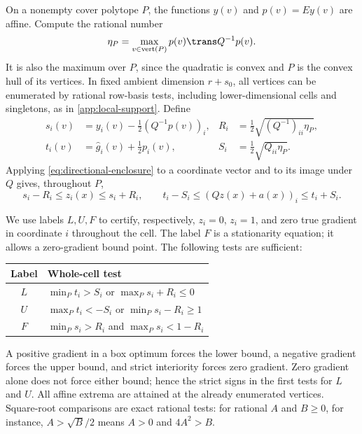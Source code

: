 On a nonempty cover polytope $P$, the functions $y(v)$ and $p(v)=Ey(v)$
are affine. Compute the rational number
\begin{equation}\label{eq:screening-eta}
       \eta_P=\max_{v\in\operatorname{vert}(P)}p(v)\trans Q^{-1}p(v).
\end{equation}
It is also the maximum over $P$, since the quadratic is convex and
$P$ is the convex hull of its vertices. In fixed ambient dimension
$r+s_0$, all vertices can be enumerated by rational row-basis tests,
including lower-dimensional cells and singletons, as in
\cref{app:local-support}. Define
\begin{align}
 s_i(v)&=y_i(v)-\tfrac12(Q^{-1}p(v))_i,&
 R_i&=\tfrac12\sqrt{(Q^{-1})_{ii}\eta_P},
 \label{eq:screening-centers}\\
 t_i(v)&=\widehat g_i(v)+\tfrac12p_i(v),&
 S_i&=\tfrac12\sqrt{Q_{ii}\eta_P}.
 \nonumber
\end{align}
Applying \eqref{eq:directional-enclosure} to a coordinate vector
and to its image under $Q$ gives, throughout $P$,
\begin{equation}\label{eq:screening-coordinate-gradient}
 s_i-R_i\le z_i(x)\le s_i+R_i,\qquad
 t_i-S_i\le (Qz(x)+a(x))_i\le t_i+S_i.
\end{equation}

We use labels $L,U,F$ to certify, respectively, $z_i=0$, $z_i=1$,
and zero true gradient in coordinate $i$ throughout the cell. The label
$F$ is a stationarity equation; it allows a zero-gradient bound point.
The following tests are sufficient:
\begin{center}
\begin{tabular}{cl}
\toprule
Label & Whole-cell test\\
\midrule
$L$ & $\min_P t_i>S_i$ or $\max_P s_i+R_i\le0$\\
$U$ & $\max_P t_i<-S_i$ or $\min_P s_i-R_i\ge1$\\
$F$ & $\min_P s_i>R_i$ and $\max_P s_i<1-R_i$\\
\bottomrule
\end{tabular}
\end{center}
A positive gradient in a box optimum forces the lower bound, a negative
gradient forces the upper bound, and strict interiority forces zero
gradient. Zero gradient alone does not force either bound; hence the
strict signs in the first tests for $L$ and $U$. All affine extrema
are attained at the already enumerated vertices. Square-root comparisons
are exact rational tests: for rational $A$ and $B\ge0$, for instance,
$A>\sqrt B/2$ means $A>0$ and $4A^2>B$.

